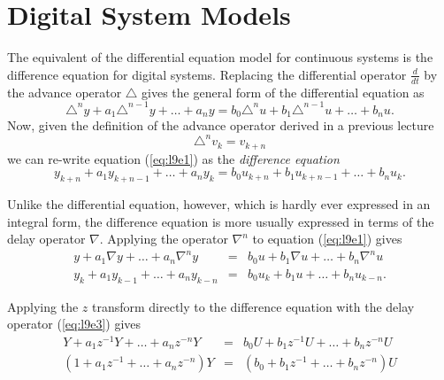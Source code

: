 \def\FileDate{98/11/18}
\def\FileVersion{1.0}

\section*{Digital System Models}

The equivalent of the differential equation model for continuous
systems is the difference equation for digital systems. Replacing
the differential operator $\frac{d}{dt}$ by the advance operator
$\triangle$ gives the general form of the differential equation as
\begin{equation}\label{eq:l9e1}
  \triangle^ny + a_{1}\triangle^{n-1}y + \ldots +  a_n y = b_0
  \triangle^n u + b_{1}\triangle^{n-1} u + \ldots + b_n u.
\end{equation}
Now, given the definition of the advance operator derived in a
previous lecture $$\triangle^n v_k = v_{k+n}$$ we can re-write
equation (\ref{eq:l9e1}) as the \emph{difference equation}
\begin{equation}\label{eq:l9e2}
  y_{k+n} + a_{1}y_{k+n-1} + \ldots + a_n y_k = b_0
   u_{k+n} + b_{1} u_{k+n-1} + \ldots +  b_n u_k.
\end{equation}

Unlike the differential equation, however, which is hardly ever
expressed in an integral form, the difference equation is more
usually expressed in terms of the delay operator $\nabla$.
Applying the operator $\nabla^n$ to equation (\ref{eq:l9e1}) gives
\begin{eqnarray}\label{eq:l9e3}
y + a_{1}\nabla y + \ldots  + a_n \nabla^n y &=& b_0 u +
b_{1}\nabla u + \ldots +  b_n\nabla^n u\\
  y_{k} + a_{1}y_{k-1} + \ldots +  a_n y_{k-n}
   &=& b_0
   u_{k} + b_{1} u + \ldots + b_n u_{k-n}.\label{eq:19e4}
   \end{eqnarray}

Applying the $z$ transform directly to the difference equation
with the delay operator (\ref{eq:l9e3}) gives
\begin{eqnarray}\label{l9e5}
 Y + a_{1}z^{-1} Y + \ldots + a_n z^{-n} Y
&=& b_0 U + b_{1}z^{-1} U + \ldots + b_n z^{-n} U\\ (1 +
a_{1}z^{-1} + \ldots +  a_n z^{-n}) Y &=& (b_0 + b_{1}z^{-1} +
\ldots + b_n z^{-n}) U \label{eq:19e6}
   \end{eqnarray}

